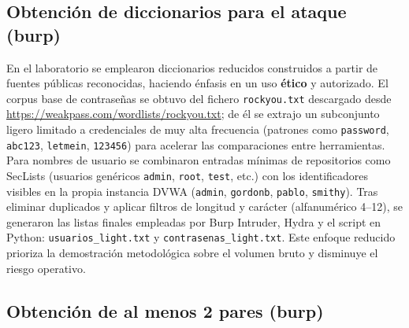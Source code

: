 \documentclass[letterpaper,12pt]{article}
\let\origsubsection\subsection
\renewcommand{\subsection}{\FloatBarrier\origsubsection}
\begin{document}
\subsection{Obtención de diccionarios para el ataque (burp)}
En el laboratorio se emplearon diccionarios reducidos construidos a partir de fuentes públicas reconocidas, haciendo énfasis en un uso \textbf{ético} y autorizado. El corpus base de contraseñas se obtuvo del fichero \texttt{rockyou.txt} descargado desde \url{https://weakpass.com/wordlists/rockyou.txt}; de él se extrajo un subconjunto ligero limitado a credenciales de muy alta frecuencia (patrones como \texttt{password}, \texttt{abc123}, \texttt{letmein}, \texttt{123456}) para acelerar las comparaciones entre herramientas. Para nombres de usuario se combinaron entradas mínimas de repositorios como SecLists (usuarios genéricos \texttt{admin}, \texttt{root}, \texttt{test}, etc.) con los identificadores visibles en la propia instancia DVWA (\texttt{admin}, \texttt{gordonb}, \texttt{pablo}, \texttt{smithy}). Tras eliminar duplicados y aplicar filtros de longitud y carácter (alfanumérico 4--12), se generaron las listas finales empleadas por Burp Intruder, Hydra y el script en Python: \texttt{usuarios\_light.txt} y \texttt{contrasenas\_light.txt}. Este enfoque reducido prioriza la demostración metodológica sobre el volumen bruto y disminuye el riesgo operativo.

\subsection{Obtención de al menos 2 pares (burp)}
\end{document}
